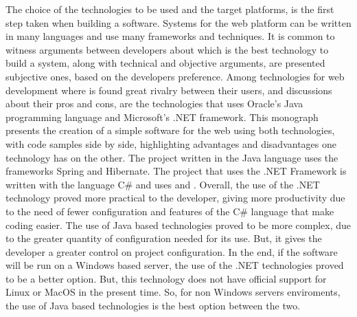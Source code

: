 The choice of the technologies to be used and the target platforms, is the first step taken when building a software. Systems for the web platform  can be written in many languages and use many frameworks and techniques. It is common to witness arguments between developers about which is the best technology to build a system, along with technical and objective arguments, are presented subjective ones, based on the developers preference. Among technologies for web development where is found great rivalry between their users, and discussions about their pros and cons, are the technologies that uses Oracle's Java programming language and Microsoft's .NET framework. This monograph presents the creation of a simple software for the web using both technologies, with code samples side by side, highlighting advantages and disadvantages one technology has on the other. The project written in the Java language uses the frameworks Spring and Hibernate. The project that uses the .NET Framework is written with the language C\# and uses  and . Overall, the use of the .NET technology proved more practical to the developer, giving more productivity due to the need of fewer configuration and features of the C\# language that make coding easier. The use of Java based technologies proved to be more complex, due to the greater quantity of configuration needed for its use. But, it gives the developer a greater control on project configuration. In the end, if the software will be run on a Windows based server, the use of the .NET technologies proved to be a better option. But, this technology does not have official support for Linux or MacOS in the present time. So, for non Windows servers enviroments, the use of Java based technologies is the best option between the two.

